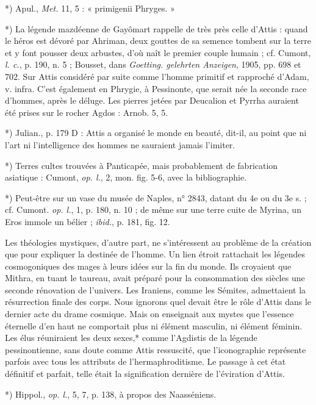 \documentclass[a4paper, 11pt, oneside, polutonikogreek, french]{article}
\begin{document}
*) Apul., \emph{Met.} 11, 5 : « primigenii Phryges. »

*) La légende mazdéenne de Gayômart rappelle de très près celle d'Attis : quand le héros est dévoré par Ahriman, deux gouttes de sa semence tombent sur la terre et y font pousser deux arbustes, d'où naît le premier couple humain ; cf. Cumont, \emph{l. c.}, p. 190, n. 5 ; Bousset, dans \emph{Goetting. gelehrten Anzeigen}, 1905, pp. 698 et 702. Sur Attis considéré par suite comme l'homme primitif et rapproché d'Adam, v. infra. C'est également en Phrygie, à Pessinonte, que serait née la seconde race d'hommes, après le déluge. Les pierres jetées par Deucalion et Pyrrha auraient été prises sur le rocher Agdos : Arnob. 5, 5.

*) Julian., p. 179 D : Attis a organisé le monde en beauté, dit-il, au point que ni l'art ni l'intelligence des hommes ne sauraient jamais l'imiter.

*) Terres cultes trouvées à Panticapée, mais probablement de fabrication asiatique : Cumont, \emph{op. l.}, 2, mon. fig. 5-6, avec la bibliographie.

*) Peut-être sur un vase du musée de Naples, n° 2843, datant du 4e ou du 3e s. ; cf. Cumont. \emph{op. l.}, 1, p. 180, n. 10 ; de même sur une terre cuite de Myrina, un Eros immole un bélier ; \emph{ibid.}, p. 181, fig. 12.

Les théologies mystiques, d'autre part, ne s'intéressent au problème de la création que pour expliquer la destinée de l'homme. Un lien étroit rattachait les légendes cosmogoniques des mages à leurs idées sur la fin du monde. Ils croyaient que Mithra, en tuant le taureau, avait préparé pour la consommation des siècles une seconde rénovation de l'univers. Les Iraniens, comme les Sémites, admettaient la résurrection finale des corps. Nous ignorons quel devait être le rôle d'Attis dans le dernier acte du drame cosmique. Mais on enseignait aux mystes que l'essence éternelle d'en haut ne comportait plus ni élément masculin, ni élément féminin. Les élus réuniraient les deux sexes,* comme l'Agdistis de la légende pessinontienne, sans doute comme Attis ressuscité, que l'iconographie représente parfois avec tous les attributs de l'hermaphroditisme. Le passage à cet état définitif et parfait, telle était la signification dernière de l'éviration d'Attis.

*) Hippol., \emph{op. l.}, 5, 7, p. 138, à propos des Naasséniens.
\end{document}
